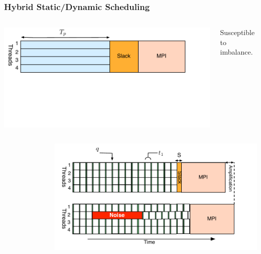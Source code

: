\begin{frame}[label=hybridstatdyn]
\frametitle{Hybrid Static/Dynamic Scheduling}
\begin{columns}
  \vspace*{-0.2in}


 \vspace*{-0.2in}
  \begin{center}
    \includegraphics[scale=0.31]{images/threadedCompRegion-static}
  \end{center} 
  \vspace*{-0.4in}
  \begin{center} 
    \tiny Susceptible to imbalance.  
  \end{center} 
\end{columns}
\begin{columns}
\vspace*{-0.15in}
\begin{figure}

\end{figure}
  \begin{center}
    \includegraphics[scale=0.31]{images/threadedCompRegion-dynamic}

\end{center}
\end{columns}
\end{frame}
